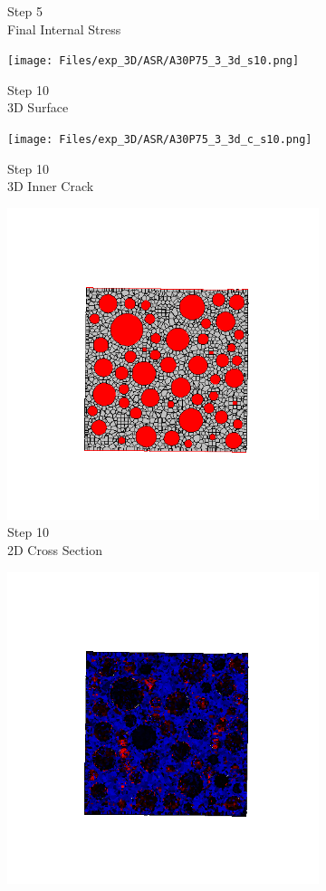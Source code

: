 \begin{figure}[ht!]
\begin{subfigure}{.25\textwidth}
      \caption{Step 5\\Final Internal Stress}
    \end{subfigure}
    \begin{subfigure}{.25\textwidth}
      \centering
      \texttt{[image: Files/exp\_3D/ASR/A30P75\_3\_3d\_s10.png]}
      \caption{Step 10\\3D Surface}
    \end{subfigure}%
    \begin{subfigure}{.25\textwidth}
      \centering
      \texttt{[image: Files/exp\_3D/ASR/A30P75\_3\_3d\_c\_s10.png]}
      \caption{Step 10\\3D Inner Crack}
    \end{subfigure}%
    \begin{subfigure}{.25\textwidth}
      \centering
      \includegraphics[width=.8\linewidth]{Files/exp_3D/ASR/A30P75_3_c10.png}
      \caption{Step 10\\2D Cross Section}
    \end{subfigure}%
    \begin{subfigure}{.25\textwidth}
      \centering
      \includegraphics[width=.8\linewidth]{Files/exp_3D/ASR/A30P75_3_s10.png}

\end{subfigure}
\end{figure}
